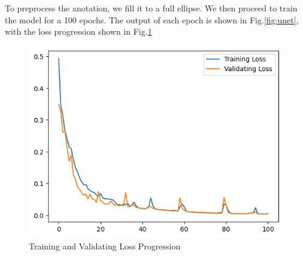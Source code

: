 \documentclass{article}
\begin{document}
To preprocess the anotation, we fill it to a full ellipse. We then proceed to train the model for a 100 epochs. The output of each epoch is shown in Fig.\ref{fig:unet}, with the loss progression shown in Fig.\ref{fig:loss}
\begin{figure}[H]
    \centering
    \includegraphics[width=0.7\linewidth]{Unknown-31.png}
    \caption{Training and Validating Loss Progression}
    \label{fig:loss}
\end{figure}
\end{document}
